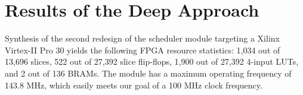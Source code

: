 \section{Results of the Deep Approach}
\label{sec:results2}

Synthesis of the second redesign of the scheduler module targeting a Xilinx
\cite{xilinx} Virtex-II Pro 30 yields the following FPGA resource statistics:
1,034 out of 13,696 slices, 522 out of 27,392 slice flip-flops, 1,900 out of
27,392 4-input LUTs, and 2 out of 136 BRAMs.  The module has a maximum
operating frequency of 143.8 MHz, which easily meets our goal of a 100 MHz
clock frequency.

